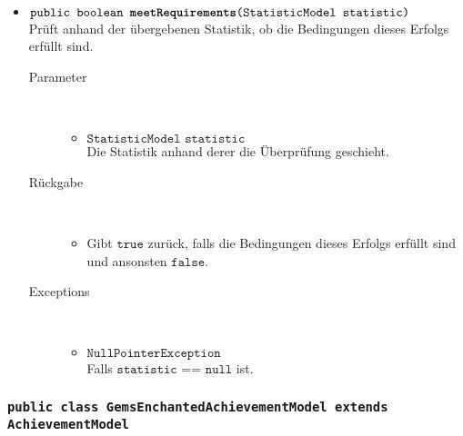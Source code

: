 \begin{description}
\begin{itemize}
				\item $\texttt{public boolean \textbf{meetRequirements}(StatisticModel statistic)}$ \\ Prüft anhand der übergebenen Statistik, ob die Bedingungen dieses Erfolgs erfüllt sind.
				\begin{description}
				\item[Parameter] \hfill \\
					\vspace{-.8cm}
					\begin{itemize}
						\item $\texttt{StatisticModel statistic}$ \\ Die Statistik anhand derer die Überprüfung geschieht. 
					\end{itemize}
					\item[Rückgabe] \hfill \\
					\vspace{-.8cm}
					\begin{itemize}
						\item Gibt $\texttt{true}$ zurück, falls die Bedingungen dieses Erfolgs erfüllt sind und ansonsten $\texttt{false}$.
					\end{itemize}
					\item[Exceptions] \hfill \\
					\vspace{-.8cm}
					\begin{itemize}
						\item $\texttt{NullPointerException}$ \\ Falls $\texttt{statistic == null}$ ist.
					\end{itemize}
				\end{description}		
				
			\end{itemize}
		\end{description}
		
		\subsubsection{\normalfont \texttt{public class \textbf{GemsEnchantedAchievementModel} extends AchievementModel}}
		
